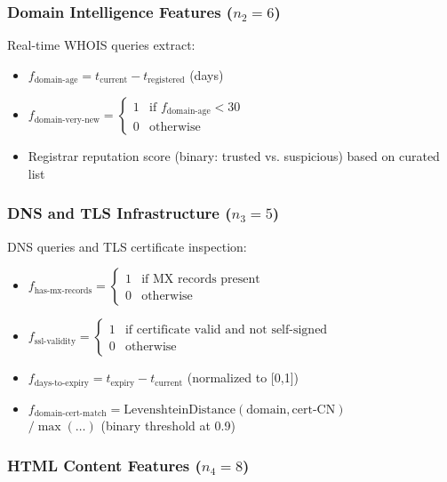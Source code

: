 \documentclass[conference]{IEEEtran}
\begin{document}
\subsubsection{Domain Intelligence Features ($n_2 = 6$)}

Real-time WHOIS queries extract:
\begin{itemize}
\item $f_{\text{domain-age}} = t_{\text{current}} - t_{\text{registered}}$ (days)
\item $f_{\text{domain-very-new}} = \begin{cases} 1 & \text{if } f_{\text{domain-age}} < 30 \\ 0 & \text{otherwise} \end{cases}$
\item Registrar reputation score (binary: trusted vs. suspicious) based on curated list
\end{itemize}

\subsubsection{DNS and TLS Infrastructure ($n_3 = 5$)}

DNS queries and TLS certificate inspection:
\begin{itemize}
\item $f_{\text{has-mx-records}} = \begin{cases} 1 & \text{if MX records present} \\ 0 & \text{otherwise} \end{cases}$
\item $f_{\text{ssl-validity}} = \begin{cases} 1 & \text{if certificate valid and not self-signed} \\ 0 & \text{otherwise} \end{cases}$
\item $f_{\text{days-to-expiry}} = t_{\text{expiry}} - t_{\text{current}}$ (normalized to [0,1])
\item $f_{\text{domain-cert-match}} = \text{LevenshteinDistance}(\text{domain}, \text{cert-CN})$ \\
\quad $/ \max(\ldots)$ (binary threshold at 0.9)
\end{itemize}

\subsubsection{HTML Content Features ($n_4 = 8$)}
\end{document}
